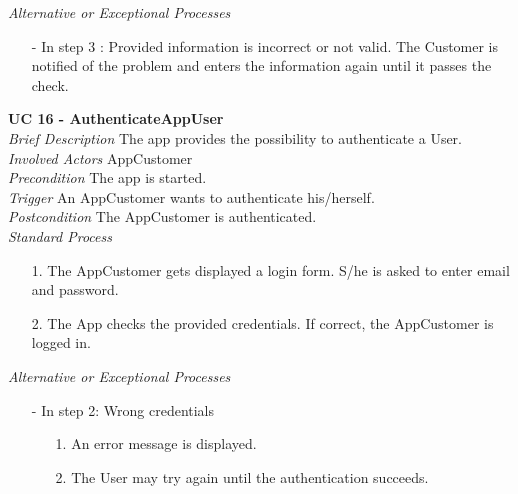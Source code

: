\textit{Alternative or Exceptional Processes}
\begin{itemize}
	\item[-] In step 3 : Provided information is incorrect or not valid. The Customer is notified of the problem and enters the information again until it passes the check.	
\end{itemize}

\textbf{UC 16 - AuthenticateAppUser}\\ \newline
\textit{Brief Description} The app provides the possibility to authenticate a User.\\ \newline
\textit{Involved Actors} AppCustomer\\ \newline
\textit{Precondition} The app is started.\\ \newline
\textit{Trigger} An AppCustomer wants to authenticate his/herself.\\ \newline
\textit{Postcondition} The AppCustomer is authenticated.\\ \newline
\textit{Standard Process}
\begin{itemize}[leftmargin=*]
	\item[1.] The AppCustomer gets displayed a login form. S/he is asked to enter email and password.
	\item[2.] The App checks the provided credentials. If correct, the AppCustomer is logged in.
\end{itemize}

\textit{Alternative or Exceptional Processes}
\begin{itemize}
	\item[-] In step 2: Wrong credentials
	\begin{itemize}
		\item[1.] An error message is displayed.
		\item[2.] The User may try again until the authentication succeeds.
	\end{itemize}
\end{itemize}


\newpage

